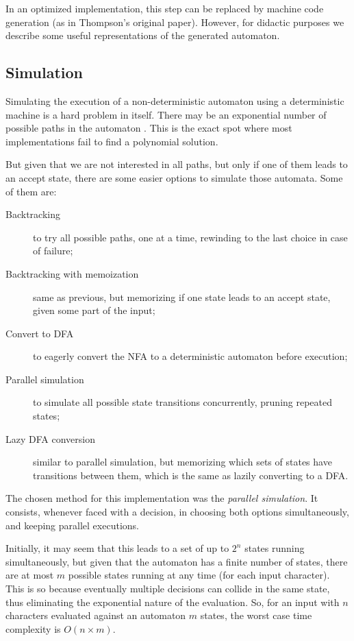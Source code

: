 \documentclass{llncs}
\begin{document}
In an optimized implementation, this step can be replaced by machine code generation (as in Thompson's original paper). However, for didactic purposes we describe some useful representations of the generated automaton. 

\subsection{Simulation}

Simulating the execution of a non-deterministic automaton using a deterministic machine is a hard problem in itself. There may be an exponential number of possible paths in the automaton \cite{bib:Rabin59}. This is the exact spot where most implementations fail to find a polynomial solution.

But given that we are not interested in all paths, but only if one of them leads to an accept state, there are some easier options to simulate those automata. Some of them are:

\begin{description}
    \item[Backtracking] to try all possible paths, one at a time, rewinding to the last choice in case of failure;
    \item[Backtracking with memoization] same as previous, but memorizing if one state leads to an accept state, given some part of the input;
    \item[Convert to DFA] to eagerly convert the NFA to a deterministic automaton before execution;
    \item[Parallel simulation] to simulate all possible state transitions concurrently, pruning repeated states;
	\item[Lazy DFA conversion] similar to parallel simulation, but memorizing which sets of states have transitions between them, which is the same as lazily converting to a DFA.
\end{description}

The chosen method for this implementation was the \emph{parallel simulation}. It consists, whenever faced with a decision, in choosing both options simultaneously, and keeping parallel executions. 

Initially, it may seem that this leads to a set of up to $2^n$ states running simultaneously, but given that the automaton has a finite number of states, there are at most $m$ possible states running at any time (for each input character). This is so because eventually multiple decisions can collide in the same state, thus eliminating the exponential nature of the evaluation. So, for an input with $n$ characters evaluated against an automaton $m$ states, the worst case time complexity is $O(n \times m)$. 
\end{document}
